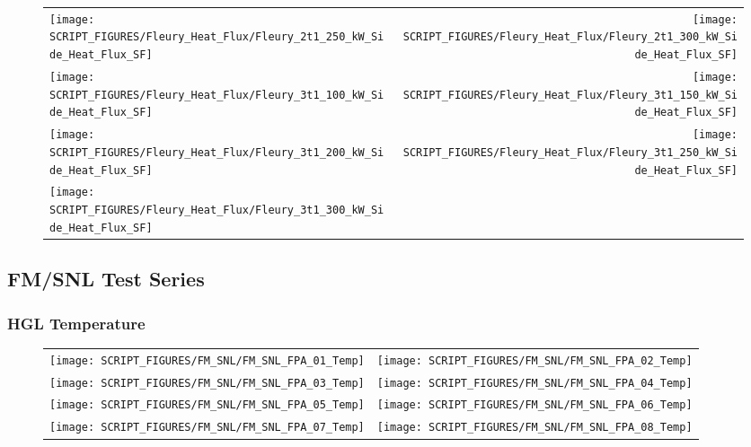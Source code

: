 \begin{figure}[!ht]
\begin{tabular*}{\textwidth}{l@{\extracolsep{\fill}}r}
\texttt{[image: SCRIPT\_FIGURES/Fleury\_Heat\_Flux/Fleury\_2t1\_250\_kW\_Side\_Heat\_Flux\_SF]} &
\texttt{[image: SCRIPT\_FIGURES/Fleury\_Heat\_Flux/Fleury\_2t1\_300\_kW\_Side\_Heat\_Flux\_SF]} \\
\texttt{[image: SCRIPT\_FIGURES/Fleury\_Heat\_Flux/Fleury\_3t1\_100\_kW\_Side\_Heat\_Flux\_SF]} &
\texttt{[image: SCRIPT\_FIGURES/Fleury\_Heat\_Flux/Fleury\_3t1\_150\_kW\_Side\_Heat\_Flux\_SF]} \\
\texttt{[image: SCRIPT\_FIGURES/Fleury\_Heat\_Flux/Fleury\_3t1\_200\_kW\_Side\_Heat\_Flux\_SF]} &
\texttt{[image: SCRIPT\_FIGURES/Fleury\_Heat\_Flux/Fleury\_3t1\_250\_kW\_Side\_Heat\_Flux\_SF]} \\
\texttt{[image: SCRIPT\_FIGURES/Fleury\_Heat\_Flux/Fleury\_3t1\_300\_kW\_Side\_Heat\_Flux\_SF]}
\end{tabular*}
\end{figure}

\clearpage

\subsection{FM/SNL Test Series}

\subsubsection{HGL Temperature}

\begin{figure}[!ht]
\begin{tabular*}{\textwidth}{l@{\extracolsep{\fill}}r}
\texttt{[image: SCRIPT\_FIGURES/FM\_SNL/FM\_SNL\_FPA\_01\_Temp]} &
\texttt{[image: SCRIPT\_FIGURES/FM\_SNL/FM\_SNL\_FPA\_02\_Temp]} \\
\texttt{[image: SCRIPT\_FIGURES/FM\_SNL/FM\_SNL\_FPA\_03\_Temp]} &
\texttt{[image: SCRIPT\_FIGURES/FM\_SNL/FM\_SNL\_FPA\_04\_Temp]} \\
\texttt{[image: SCRIPT\_FIGURES/FM\_SNL/FM\_SNL\_FPA\_05\_Temp]} &
\texttt{[image: SCRIPT\_FIGURES/FM\_SNL/FM\_SNL\_FPA\_06\_Temp]} \\
\texttt{[image: SCRIPT\_FIGURES/FM\_SNL/FM\_SNL\_FPA\_07\_Temp]} &
\texttt{[image: SCRIPT\_FIGURES/FM\_SNL/FM\_SNL\_FPA\_08\_Temp]}
\end{tabular*}
\end{figure}

